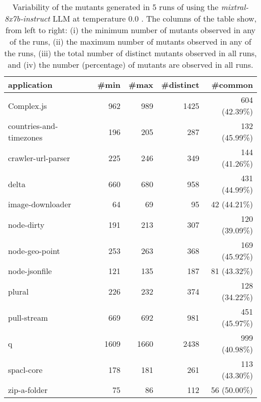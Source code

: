 
\begin{table}[hbt!]
\centering
{\footnotesize
\begin{tabular}{l|r|r|r|r}

{\bf application}  & {\bf \#min} &  {\bf \#max} &  {\bf \#distinct} & {\bf \#common}\\
\hline
Complex.js & 962 & 989 & 1425 & 604 (42.39\%) \\ 
countries-and-timezones & 196 & 205 & 287 & 132 (45.99\%) \\ 
crawler-url-parser & 225 & 246 & 349 & 144 (41.26\%) \\ 
delta & 660 & 680 & 958 & 431 (44.99\%) \\ 
image-downloader & 64 & 69 & 95 & 42 (44.21\%) \\ 
node-dirty & 191 & 213 & 307 & 120 (39.09\%) \\ 
node-geo-point & 253 & 263 & 368 & 169 (45.92\%) \\ 
node-jsonfile & 121 & 135 & 187 & 81 (43.32\%) \\ 
plural & 226 & 232 & 374 & 128 (34.22\%) \\ 
pull-stream & 669 & 692 & 981 & 451 (45.97\%) \\ 
q & 1609 & 1660 & 2438 & 999 (40.98\%) \\ 
spacl-core & 178 & 181 & 261 & 113 (43.30\%) \\ 
zip-a-folder & 75 & 86 & 112 & 56 (50.00\%) \\ 
\end{tabular}
}
\caption{
  Variability of the mutants generated in 5 runs of \ToolName using the \textit{mixtral-8x7b-instruct} LLM
       at temperature 0.0 . The columns of the table show, from left to right:
    (i) the minimum number of mutants observed in any of the runs,
    (ii) the maximum number of mutants observed in any of the runs,
    (iii) the total number of distinct mutants observed in all runs, and
    (iv) the number (percentage) of mutants are observed in all runs.
}
\label{table:Variability_mixtral-8x7b-instruct_0.0}
\end{table}